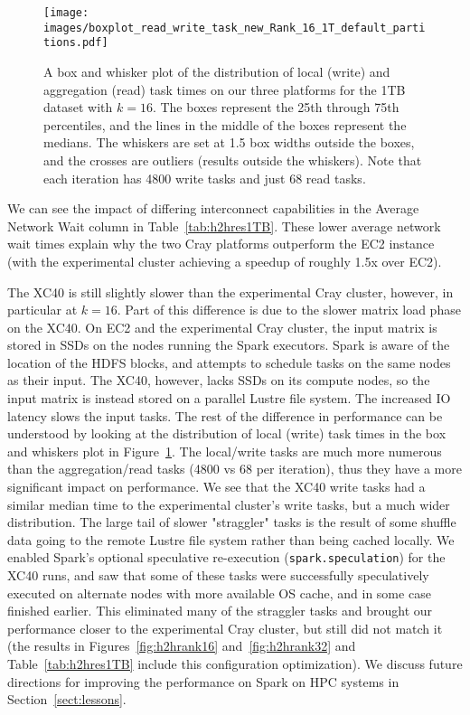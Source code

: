    \begin{figure} [H]
    \begin{centering}
    \texttt{[image: images/boxplot\_read\_write\_task\_new\_Rank\_16\_1T\_default\_partitions.pdf]}
    \end{centering}
    \caption{A box and whisker plot of the distribution of local (write) and aggregation (read) task times on our three platforms for the 1TB dataset with $k=16$.  The boxes represent the 25th through 75th percentiles, and the lines in the middle of the boxes represent the medians.  The whiskers are set at 1.5 box widths outside the boxes, and the crosses are outliers (results outside the whiskers).  Note that each iteration has 4800 write tasks and just 68 read tasks.}
    \label{fig:rwtaskdist} 
    \end{figure}

We can see the impact of differing interconnect capabilities in the Average Network Wait column in Table~\ref{tab:h2hres1TB}.   These lower average network wait times explain why the two Cray platforms outperform the EC2 instance (with the experimental cluster achieving a speedup of roughly 1.5x over EC2).  

The XC40 is still slightly slower than the experimental Cray cluster, however, in particular at $k=16$.
Part of this difference is due to the slower matrix load phase on the XC40.  On EC2 and the experimental
Cray cluster, the input matrix is stored in SSDs on the nodes running the Spark executors.  Spark is 
aware of the location of the HDFS blocks, and attempts to schedule tasks on the same nodes as their 
input.  The XC40, however, lacks SSDs on its compute nodes, so the input matrix is instead stored on a 
parallel Lustre file system.  The increased IO latency slows the input tasks. The rest of the difference in 
performance can be understood by looking at the distribution of local (write) task times in the box and 
whiskers plot in Figure~\ref{fig:rwtaskdist}.  The local/write tasks are much more numerous than the 
aggregation/read tasks (4800 vs 68 per iteration), thus they have a more significant impact on 
performance. We see that the XC40 write tasks had a similar median time to the experimental cluster's 
write tasks, but a much wider distribution.  The large tail of slower "straggler" tasks is the result of some shuffle data going to the remote Lustre file system rather than being cached locally. We enabled Spark's optional speculative re-execution (\texttt{spark.speculation}) for the XC40 runs, and saw that some of these tasks were successfully speculatively executed on alternate nodes with more available OS cache, and in some case finished earlier.  This eliminated many of the straggler tasks and brought our performance closer to the experimental Cray cluster, but still did not match it (the results in Figures~\ref{fig:h2hrank16} and~\ref{fig:h2hrank32} and Table~\ref{tab:h2hres1TB} include this configuration optimization).  We discuss future directions for improving the performance on Spark on HPC systems in Section~\ref{sect:lessons}.
